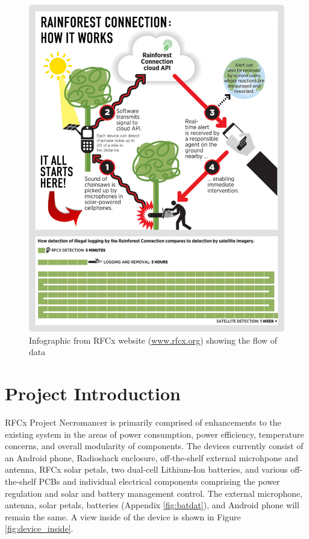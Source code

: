 \documentclass{article}
\numberwithin{figure}{section}
\numberwithin{equation}{section}
\begin{document}
{\begin{figure}[H]
  \centering
  \includegraphics[height=0.76\textwidth]{infographic}
  \caption{Infographic from RFCx website (\href{www.rfcx.org}{www.rfcx.org}) showing the flow of data}
  \label{fig:infographic}
\end{figure}
\newpage

\section{Project Introduction} \label{sect:intro}
RFCx Project Necromancer is primarily comprised of enhancements to the existing system in the areas of power consumption, power efficiency, temperature concerns, and overall modularity of components. The devices currently consist of an Android phone, Radioshack enclosure, off-the-shelf external microhpone and antenna, RFCx solar petals, two dual-cell Lithium-Ion batteries, and  various off-the-shelf PCBs and individual electrical components comprising the power regulation and solar and battery management control. The external microphone, antenna, solar petals, batteries (Appendix \ref{fig:batdat}), and Android phone will remain the same. A view inside of the device is shown in Figure \ref{fig:device_inside}.

}
\end{document}
